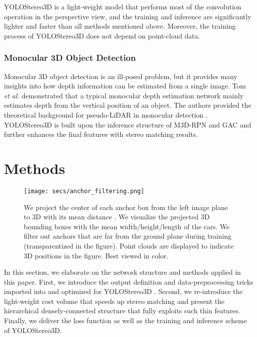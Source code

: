\documentclass[letterpaper, 10 pt, conference]{ieeeconf}
\begin{document}
YOLOStereo3D is a light-weight model that performs most of the convolution operation in the perspective view, and the training and inference are significantly lighter and faster than all methods mentioned above.
Moreover, the training process of YOLOStereo3D does not depend on point-cloud data.

\subsubsection{Monocular 3D Object Detection}

Monocular 3D object detection is an ill-posed problem, but it provides many insights into how depth information can be estimated from a single image.
Tom \textit{et al.} \cite{tom2019howdepth} demonstrated that a typical monocular depth estimation network mainly estimates depth from the vertical position of an object.
The authors \cite{tom2019howdepth} provided the theoretical background for pseudo-LiDAR in monocular detection \cite{Vianney2019RefinedMPL}\cite{Weng2019Plidar}.
YOLOStereo3D is built upon the inference structure of M3D-RPN \cite{Brazil2019M3DRPN} and GAC \cite{liu2021GAC} and further enhances the final features with stereo matching results.

 
\section{Methods}
\begin{figure*}
    \centering
    \texttt{[image: secs/anchor\_filtering.png]}
        
    \caption{We project the center of each anchor box from the left image plane to 3D with its mean distance . We visualize the projected 3D bounding boxes with the mean width/height/length of the cars.
    We filter out anchors that are far from the ground plane during training (transparentized in the figure).
    Point clouds are displayed to indicate 3D positions in the figure. Best viewed in color.
    }
    \label{fig:anchor}
\end{figure*}
 
In this section, we elaborate on the network structure and methods applied in this paper.
First, we introduce the output definition and data-preprocessing tricks imported into and optimized for YOLOStereo3D \cite{liu2021GAC}.
Second, we re-introduce the light-weight cost volume that speeds up stereo matching and present the hierarchical densely-connected structure that fully exploits such thin features.
Finally, we deliver the loss function as well as the training and inference scheme of YOLOStereo3D.
\end{document}
